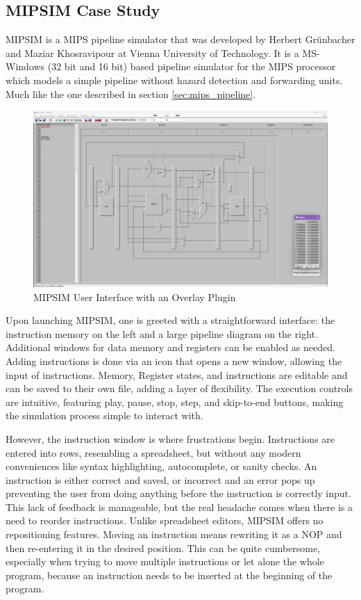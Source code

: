 \subsection{MIPSIM Case Study}

MIPSIM is a MIPS pipeline simulator that was developed by Herbert Grünbacher and Maziar Khosravipour at Vienna University of Technology. It is a MS-Windows (32 bit and 16 bit) based pipeline simulator for the MIPS processor which models a simple pipeline without hazard detection and forwarding units\cite{grunbacher1996windlx}. Much like the one described in section \ref{sec:mips_pipeline}.
\begin{figure}[H]
    \centering
    \includegraphics[width=1\textwidth]{assets/images/mipsim.png}
    \caption{MIPSIM User Interface with an Overlay Plugin}
    \label{fig:mipsim}
\end{figure}
Upon launching MIPSIM, one is greeted with a straightforward interface: the instruction memory on the left and a large pipeline diagram on the right. Additional windows for data memory and registers can be enabled as needed. Adding instructions is done via an icon that opens a new window, allowing the input of instructions. Memory, Register states, and instructions are editable and can be saved to their own file, adding a layer of flexibility. The execution controls are intuitive, featuring play, pause, stop, step, and skip-to-end buttons, making the simulation process simple to interact with.

However, the instruction window is where frustrations begin. Instructions are entered into rows, resembling a spreadsheet, but without any modern conveniences like syntax highlighting, autocomplete, or sanity checks. An instruction is either correct and saved, or incorrect and an error pops up preventing the user from doing anything before the instruction is correctly input. This lack of feedback is manageable, but the real headache comes when there is a need to reorder instructions. Unlike spreadsheet editors, MIPSIM offers no repositioning features. Moving an instruction means rewriting it as a NOP and then re-entering it in the desired position. This can be quite cumbersome, especially when trying to move multiple instructions or let alone the whole program, because an instruction needs to be inserted at the beginning of the program.

